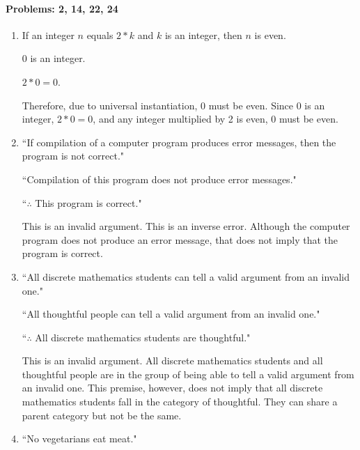 \documentclass{article}
\makeatletter
\newcommand\setItemnumber[1]{\setcounter{enum\romannumeral\@enumdepth}{\numexpr#1-1\relax}}
\makeatother
\begin{document}
\paragraph{Problems: 2, 14, 22, 24}
\begin{enumerate}
    \setItemnumber{2}
    \item If an integer $n$ equals $2*k$ and $k$ is an integer, then $n$ is even.

    0 is an integer.

    $2*0 = 0$.

    Therefore, due to universal instantiation, 0 must be even. Since 0 is an integer, $2*0=0$, and any integer multiplied by 2 is even, 0 must be even.
    \setItemnumber{14}
    \item ``If compilation of a computer program produces error messages, then the program is not correct." 
    
    ``Compilation of this program does not produce error messages."

    ``$\therefore$ This program is correct."

    This is an invalid argument. This is an inverse error. Although the computer program does not produce an error message, that does not imply that the program is correct.
    \setItemnumber{22}
    \item 
    ``All discrete mathematics students can tell a valid argument from an invalid one."
    
    ``All thoughtful people can tell a valid argument from an invalid one." 
    
    ``$\therefore$ All discrete mathematics students are thoughtful."

    This is an invalid argument. All discrete mathematics students and all thoughtful people are in the group of being able to tell a valid argument from an invalid one. This premise, however, does not imply that all discrete mathematics students fall in the category of thoughtful. They can share a parent category but not be the same.

    
\setItemnumber{24}
\item ``No vegetarians eat meat." 


\end{enumerate}
\end{document}
